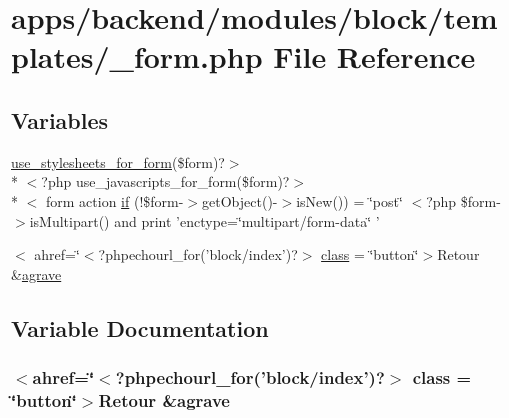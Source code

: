 \hypertarget{backend_2modules_2block_2templates_2__form_8php}{\section{apps/backend/modules/block/templates/\-\_\-form.php File Reference}
\label{backend_2modules_2block_2templates_2__form_8php}
}
\subsection*{Variables}
\begin{DoxyCompactItemize}
\item 
\hyperlink{live_2modules_2user_2templates_2__form_8php_a86bc4522fdbe625b07bc4a4d6eec3df7}{use\-\_\-stylesheets\-\_\-for\-\_\-form}(\$form)?$>$\\*
$<$?php use\-\_\-javascripts\-\_\-for\-\_\-form(\$form)?$>$\\*
$<$ form action \hyperlink{backend_2modules_2block_2templates_2__form_8php_ac1bba3247fcb3ee581bca22cc89e97bd}{if} (!\$form-\/$>$get\-Object()-\/$>$is\-New()) = \char`\"{}post\char`\"{} $<$?php \$form-\/$>$is\-Multipart() and print 'enctype=\char`\"{}multipart/form-\/data\char`\"{} '
\item 
$<$ ahref=\char`\"{}$<$?phpechourl\-\_\-for('block/index')?$>$ \hyperlink{backend_2modules_2block_2templates_2__form_8php_ad4a499e2c5dcc18350dc1b0998e7f432}{class} = \char`\"{}button\char`\"{}$>$Retour \&\hyperlink{presse_2modules_2page_2templates_2concours_ouikos_success_8php_adcbedde811e3c81b65c252edf38caea2}{agrave}
\end{DoxyCompactItemize}


\subsection{Variable Documentation}
\hypertarget{backend_2modules_2block_2templates_2__form_8php_ad4a499e2c5dcc18350dc1b0998e7f432}{
\subsubsection[{class}]{\setlength{\rightskip}{0pt plus 5cm}$<$ahref=\char`\"{}$<$?phpechourl\-\_\-for('block/index')?$>$ class = \char`\"{}button\char`\"{}$>$Retour \&{\bf agrave}}}\label{backend_2modules_2block_2templates_2__form_8php_ad4a499e2c5dcc18350dc1b0998e7f432}


